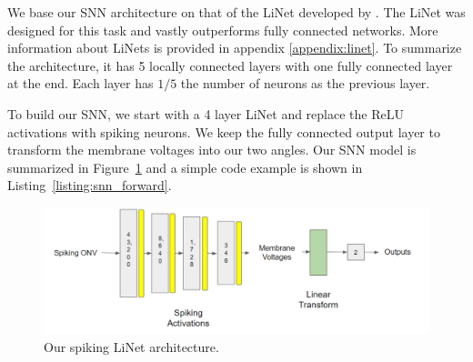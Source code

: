 \documentclass [MS] {UCLAthesis}
\begin{document}
We base our SNN architecture on that of the LiNet developed by \citet{Masaki}. The LiNet was designed for this task and vastly outperforms fully connected networks. More information about LiNets is provided in appendix \ref{appendix:linet}. To summarize the architecture, it has 5 locally connected layers with one fully connected layer at the end. Each layer has $1/5$ the number of neurons as the previous layer. 

To build our SNN, we start with a 4 layer LiNet and replace the ReLU activations with spiking neurons. We keep the fully connected output layer to transform the membrane voltages into our two angles. Our SNN model is summarized in Figure~\ref{fig:linet_arch} and a simple code example is shown in Listing~\ref{listing:snn_forward}.

\begin{figure}
    \centering
    \includegraphics[width=\textwidth]{arch_spiking}
    \caption[SNN architecture]{Our spiking LiNet architecture.}
    \label{fig:linet_arch}
\end{figure}






\end{document}
